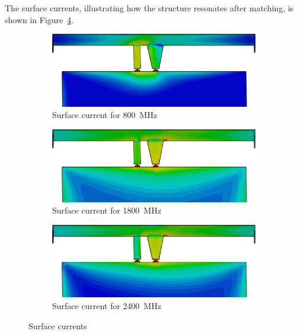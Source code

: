 The surface currents, illustrating how the structure resonates after matching, is shown in Figure~\ref{fig:ant3_sc}.


\begin{figure}[htbp]
   \begin{subfigure}[b]{0.32\linewidth}
        \centering
        \includegraphics[width=\linewidth]{img/tech_sol/nonresonant/finka-surface-800}
        \caption{Surface current for \SI{800}{MHz}}
        \label{fig:ant3_sc800}
    \end{subfigure}
    \hfill
    \begin{subfigure}[b]{0.32\linewidth}
        \centering
        \includegraphics[width=\linewidth]{img/tech_sol/nonresonant/finka-surface-1800}
        \caption{Surface current for \SI{1800}{MHz}}
        \label{fig:ant3_sc1800}
    \end{subfigure}
    \hfill
    \begin{subfigure}[b]{0.32\linewidth}
        \centering
        \includegraphics[width=\linewidth]{img/tech_sol/nonresonant/finka-surface-2400}
        \caption{Surface current for \SI{2400}{MHz}}
        \label{fig:ant3_sc2400}
    \end{subfigure}
    \caption{Surface currents}
    \label{fig:ant3_sc}
\end{figure}

